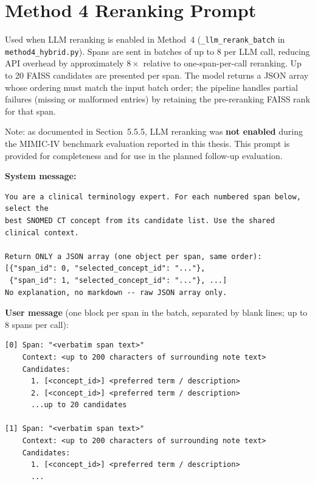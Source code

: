 \documentclass{EPL-master-thesis-covers-EN}
\begin{document}
    \section{Method 4 Reranking Prompt}
    \label{sec:m4rerank}

    Used when LLM reranking is enabled in Method~4 (\texttt{\_llm\_rerank\_batch} in
    \texttt{method4\_hybrid.py}). Spans are sent in batches of up to 8 per LLM call,
    reducing API overhead by approximately $8\times$ relative to one-span-per-call
    reranking. Up to 20 FAISS candidates are presented per span. The model returns a JSON
    array whose ordering must match the input batch order; the pipeline handles partial
    failures (missing or malformed entries) by retaining the pre-reranking FAISS rank for
    that span.

    Note: as documented in Section~5.5.5, LLM reranking was \textbf{not enabled} during
    the MIMIC-IV benchmark evaluation reported in this thesis. This prompt is provided for
    completeness and for use in the planned follow-up evaluation.

    \medskip
    \noindent\textbf{System message:}

    \begin{verbatim}
You are a clinical terminology expert. For each numbered span below, select the
best SNOMED CT concept from its candidate list. Use the shared clinical context.

Return ONLY a JSON array (one object per span, same order):
[{"span_id": 0, "selected_concept_id": "..."},
 {"span_id": 1, "selected_concept_id": "..."}, ...]
No explanation, no markdown -- raw JSON array only.
    \end{verbatim}

    \medskip
    \noindent\textbf{User message} (one block per span in the batch, separated by blank
    lines; up to 8 spans per call):

    \begin{verbatim}
[0] Span: "<verbatim span text>"
    Context: <up to 200 characters of surrounding note text>
    Candidates:
      1. [<concept_id>] <preferred term / description>
      2. [<concept_id>] <preferred term / description>
      ...up to 20 candidates

[1] Span: "<verbatim span text>"
    Context: <up to 200 characters of surrounding note text>
    Candidates:
      1. [<concept_id>] <preferred term / description>
      ...
    \end{verbatim}

    \newpage\null\thispagestyle{empty}\newpage %
    \backcoverpage %
\end{document}
